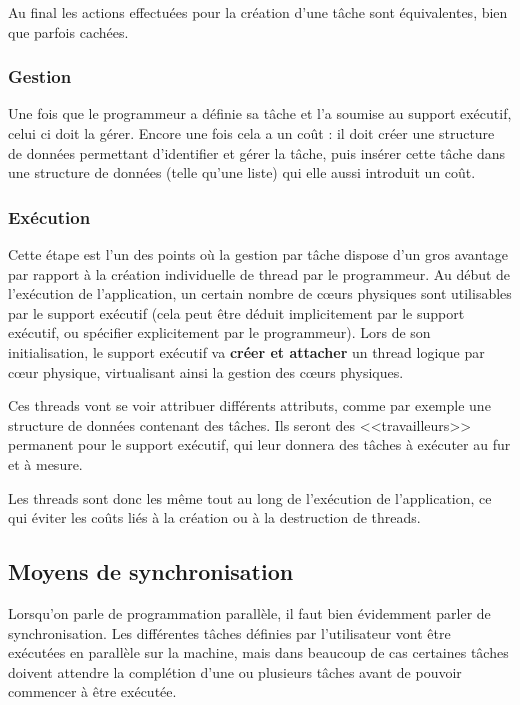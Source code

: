 Au final les actions effectuées pour la création d'une tâche sont équivalentes, bien que parfois cachées.


\subsubsection{Gestion}

Une fois que le programmeur a définie sa tâche et l'a soumise au support exécutif, celui ci doit la gérer.
Encore une fois cela a un coût : il doit créer une structure de données permettant d'identifier et gérer la tâche, puis insérer cette tâche dans une structure de données (telle qu'une liste) qui elle aussi introduit un coût.

\subsubsection{Exécution}

Cette étape est l'un des points où la gestion par tâche dispose d'un gros avantage par rapport à la création individuelle de thread par le programmeur.
Au début de l'exécution de l'application, un certain nombre de cœurs physiques sont utilisables par le support exécutif (cela peut être déduit implicitement par le support exécutif, ou spécifier explicitement par le programmeur).
Lors de son initialisation, le support exécutif va \textbf{créer et attacher} un thread logique par cœur physique, virtualisant ainsi la gestion des cœurs physiques.

Ces threads vont se voir attribuer différents attributs, comme par exemple une structure de données contenant des tâches.
Ils seront des <<travailleurs>> permanent pour le support exécutif, qui leur donnera des tâches à exécuter au fur et à mesure.

Les threads sont donc les même tout au long de l'exécution de l'application, ce qui éviter les coûts liés à la création ou à la destruction de threads. 


\subsection{Moyens de synchronisation}

Lorsqu'on parle de programmation parallèle, il faut bien évidemment parler de synchronisation.
Les différentes tâches définies par l'utilisateur vont être exécutées en parallèle sur la machine, mais dans beaucoup de cas certaines tâches doivent attendre la complétion d'une ou plusieurs tâches avant de pouvoir commencer à être exécutée.

